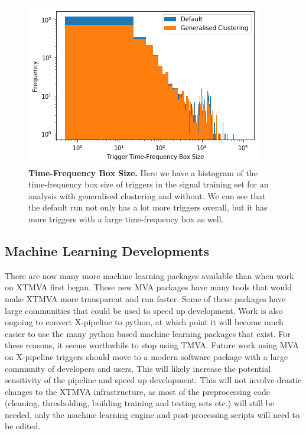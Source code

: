 \documentclass[11pt]{cuthesis}
\newcommand{\xp}{X-pipeline }
\begin{document}
\begin{figure} %
\begin{center}
\includegraphics[width=0.8\linewidth]{tf_box_histogram.png}
\end{center}
\caption{\textbf{Time-Frequency Box Size.} Here we have a histogram of the time-frequency box size of triggers in the signal training set for an analysis with generalised clustering and without. We can see that the default run not only has a lot more triggers overall, but it has more triggers with a large time-frequency box as well. }
\label{fig:tf box hist}
\end{figure}


\subsection{Machine Learning Developments}
There are now many more machine learning packages available than when work on XTMVA first began. These new MVA packages have many tools that would make XTMVA more transparent and run faster. Some of these packages have large communities that could be used to speed up development. Work is also ongoing to convert \xp to python, \cite{xpypeline} at which point it will become much easier to use the many python based machine learning packages that exist. For these reasons, it seems worthwhile to stop using TMVA. Future work using MVA on \xp triggers should move to a modern software package with a large community of developers and users. This will likely increase the potential sensitivity of the pipeline and speed up development. This will not involve drastic changes to the XTMVA infrastructure, as most of the preprocessing code (cleaning, thresholding, building training and testing sets etc.) will still be needed, only the machine learning engine and post-processing scripts will need to be edited.
\end{document}

